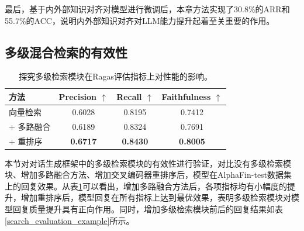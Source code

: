 最后，基于内外部知识对齐对模型进行微调后，本章方法实现了30.8\%的ARR和55.7\%的ACC，说明内外部知识对齐对LLM能力提升起着至关重要的作用。



\subsection{多级混合检索的有效性}

\begin{table}
	\caption{\label{search_module_evaluation}探究多级检索模块在Ragas评估指标上对性能的影响。}
	\centering{}%
	\small 
	\begin{tabular}{lccc}
		\toprule[2pt]
		方法 & Precision $\uparrow$ & Recall $\uparrow$ & Faithfulness $\uparrow$ \\
		\hline
		向量检索 & 0.6028 & 0.8195 & 0.7412 \\
		+ 多路融合 & 0.6189 & 0.8324 & 0.7691 \\
		+ 重排序 & \textbf{0.6717} & \textbf{0.8430} & \textbf{0.8005} \\
		\bottomrule[2pt]
	\end{tabular}
\end{table}

本节对对话生成框架中的多级检索模块的有效性进行验证，对比没有多级检索模块、增加多路融合方法、增加交叉编码器重排序后，模型在AlphaFin-test数据集上的回复效果。从表\ref{search_module_evaluation}可以看出，增加多路融合方法后，各项指标均有小幅度的提升，增加重排序后，模型回复在所有指标上达到最优效果，表明多级检索模块对模型回复质量提升具有正向作用。同时，增加多级检索模块前后的回复结果如表\ref{search_evaluation_example}所示。

